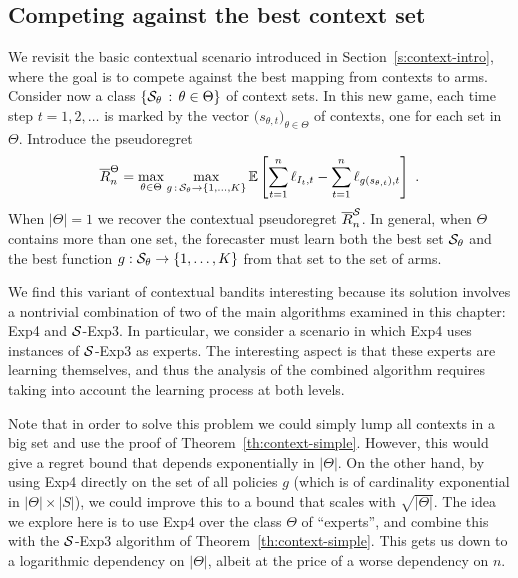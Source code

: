 \subsection{Competing against the best context set}
\label{ss:best-context}
%
We revisit the basic contextual scenario introduced in Section~\ref{s:context-intro}, where the goal is to compete against the best mapping from contexts to arms. Consider now a class $\left\{{\mathcal{S}_{\theta}}\,:\,{\theta\in\Theta}\right\}$ of context sets. In this new game, each time step $t=1,2,\dots$ is marked by the vector $\bigl(s_{\theta,t}\bigr)_{\theta\in\Theta}$ of contexts, one for each set in $\Theta$. Introduce the pseudoregret
\[
	\overline{R}^{\Theta}_n = \max_{\theta\in\Theta} \max_{g \,:\, \mathcal{S}_{\theta}\to\{1,\dots,K\}} \mathbb{E}\left[ \sum_{t=1}^n \ell_{I_t,t} - \sum_{t=1}^n \ell_{g(s_{\theta,t}),t} \right]~.
\]
When $|\Theta|=1$ we recover the contextual pseudoregret $\overline{R}^{\mathcal{S}}_n$. In general, when $\Theta$ contains more than one set, the forecaster must learn both the best set $\mathcal{S}_{\theta}$ and the best function $g : \mathcal{S}_{\theta}\to\{1,\dots,K\}$ from that set to the set of arms.

We find this variant of contextual bandits interesting because its solution involves a nontrivial combination of two of the main algorithms examined in this chapter: Exp4 and $\mathcal{S}$-Exp3. In particular, we consider a scenario in which Exp4 uses instances of $\mathcal{S}$-Exp3 as experts. The interesting aspect is that these experts are learning themselves, and thus the analysis of the combined algorithm requires taking into account the learning process at both levels.

Note that in order to solve this problem we could simply lump all contexts in a big set and use the proof of Theorem~\ref{th:context-simple}. However, this would give a regret bound that depends exponentially in $|\Theta|$. On the other hand, by using Exp4 directly on the set of all policies $g$ (which is of cardinality exponential in $|\Theta|\times|S|$), we could improve this to a bound that scales with $\sqrt{|\Theta|}$. The idea we explore here is to use Exp4 over the class $\Theta$ of ``experts'', and combine this with the $\mathcal{S}$-Exp3 algorithm of Theorem~\ref{th:context-simple}. This gets us down to a logarithmic dependency on $|\Theta|$, albeit at the price of a worse dependency on $n$.

